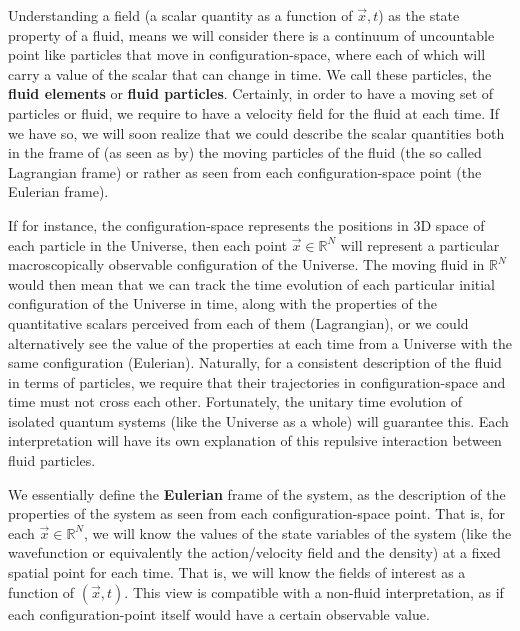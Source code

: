 \documentclass[11pt, a4paper]{article} %
\newcommand{\R}{\mathbb{R}} %
\begin{document}
Understanding a field (a scalar quantity as a function of $\vec{x},t$) as the state property of a fluid, means we will consider there is a continuum of uncountable point like particles that move in configuration-space, where each of which will carry a value of the scalar that can change in time. We call these particles, the {\bf fluid elements} or {\bf fluid particles}. Certainly, in order to have a moving set of particles or fluid, we require to have a velocity field for the fluid at each time. If we have so, we will soon realize that we could describe the scalar quantities both in the frame of (as seen as by) the moving particles of the fluid (the so called Lagrangian frame) or rather as seen from each configuration-space point (the Eulerian frame).

If for instance, the configuration-space represents the positions in 3D space of each particle in the Universe, then each point $\vec{x}\in \R^N$ will represent a particular macroscopically observable configuration of the Universe. The moving fluid in $\R^N$ would then mean that we can track the time evolution of each particular initial configuration of the Universe in time, along with the properties of the quantitative scalars perceived from each of them (Lagrangian), or we could alternatively see the value of the properties at each time from a Universe with the same configuration (Eulerian). Naturally, for a consistent description of the fluid in terms of particles, we require that their trajectories in configuration-space and time  must not cross each other. Fortunately, the unitary time evolution of isolated quantum systems (like the Universe as a whole) will guarantee this. Each interpretation will have its own explanation of this repulsive interaction between fluid particles.

We essentially define the {\bf Eulerian} frame of the system, as the description of the properties of the system as seen from each configuration-space point. That is, for each $\vec{x}\in\R^N$, we will know the values of the state variables of the system (like the wavefunction or equivalently the action/velocity field and the density) at a fixed spatial point for each time. That is, we will know the fields of interest as a function of $(\vec{x},t)$. This view is compatible with a non-fluid interpretation, as if each configuration-point itself would have a certain observable value. 
\end{document}
